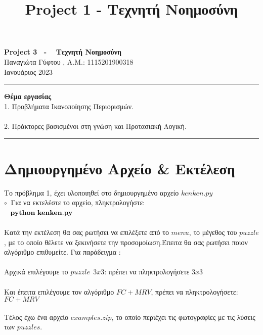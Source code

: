 \documentclass[10pt]{article}
\title{ \selectlanguage{english} Project 1 - \selectlanguage{greek} Τεχνητή Νοημοσύνη}
\begin{document}
   
   \begin{center}
        {\Large \textbf{ Project 3 \ - \  Τεχνητή Νοημοσύνη}}\\
        \vspace{1em}
        {\large Παναγιώτα Γύφτου ,   A.M.: 1115201900318  } \\
        \vspace{1em}
        {\large Ιανουάριος 2023}
    \end{center}
    
    
    \begin{center}
        \rule{150mm}{0.2mm}
    \end{center}

    \hspace{69mm}
    \textbf{Θέμα εργασίας} \\
    
\hspace{15mm}1. Προβλήματα Ικανοποίησης Περιορισμών. \\ \\

\hspace{15mm}2. Πράκτορες βασισμένοι στη γνώση και Προτασιακή Λογική.


    \begin{center}
        \rule{150mm}{0.2mm}
    \end{center}

    \vspace{5mm}
    
\section*{Δημιουργημένο Αρχείο \& Εκτέλεση}

   \vspace{5mm}

Το πρόβλημα 1, έχει υλοποιηθεί στο δημιουργημένο αρχείο $kenken.py$ \\

$\circ \ $ Για να εκτελέστε το αρχείο, πληκτρολογήστε: \\

 \ \hspace{60mm}  $ \bf python \ kenken.py$ \normalfont \\ \\ 
 Κατά την εκτέλεση θα σας ρωτήσει να επιλέξετε από το $menu$, το μέγεθος του $puzzle$, με το οποίο θέλετε να ξεκινήσετε την προσομοίωση.Έπειτα θα σας ρωτήσει ποιον αλγόριθμο επιθυμείτε. Για παράδειγμα : \\ \\
Αρχικά επιλέγουμε το $puzzle \ \ 3x3$: πρέπει να πληκτρολογήσετε $3x3$\\ \\
Και έπειτα επιλέγουμε τον αλγόριθμο $FC+MRV$, πρέπει να πληκτρολογήσετε: $FC+MRV$ \\ \\
Τέλος έχω ένα αρχείο $examples.zip$, το οποίο περιέχει τις φωτογραφίες με τις λύσεις των $puzzles$. 
\end{document}
